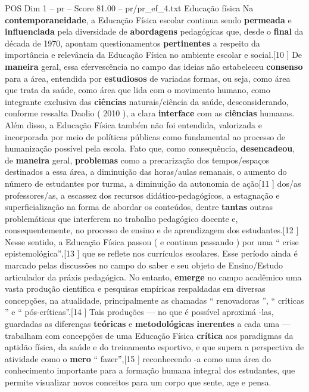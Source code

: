 \begin{textsample}{POS Dim 1 – pr – Score 81.00 – pr/pr\_ef\_4.txt}  \label{ex:f1_pos_025}
Educação física Na \textbf{contemporaneidade}, a Educação Física escolar continua sendo \textbf{permeada} e \textbf{influenciada} pela diversidade de \textbf{abordagens} pedagógicas que, desde o \textbf{final} da década de 1970, apontam questionamentos \textbf{pertinentes} a respeito da importância e relevância da Educação Física no ambiente escolar e social.[10 ] De \textbf{maneira} geral, essa efervescência no campo das ideias não estabeleceu \textbf{consenso} para a área, entendida por \textbf{estudiosos} de variadas formas, ou seja, como área que trata da saúde, como área que lida com o movimento humano, como integrante exclusiva das \textbf{ciências} naturais/ciência da saúde, desconsiderando, conforme ressalta Daolio ( 2010 ), a clara \textbf{interface} com as \textbf{ciências} humanas.
Além disso, a Educação Física também não foi entendida, valorizada e incorporada por meio de políticas públicas como fundamental ao processo de humanização possível pela escola.
Fato que, como consequência, \textbf{desencadeou}, de \textbf{maneira} geral, \textbf{problemas} como a precarização dos tempos/espaços destinados a essa área, a diminuição das horas/aulas semanais, o aumento do número de estudantes por turma, a diminuição da autonomia de ação[11 ] dos/as professores/as, a escassez dos recursos didático-pedagógicos, a estagnação e superficialização na forma de abordar os conteúdos, dentre \textbf{tantas} outras problemáticas que interferem no trabalho pedagógico docente e, consequentemente, no processo de ensino e de aprendizagem dos estudantes.[12 ] Nesse sentido, a Educação Física passou ( e continua passando ) por uma “ crise epistemológica”,[13 ] que se reflete nos currículos escolares.
Esse período ainda é marcado pelas discussões no campo do saber e seu objeto de Ensino/Estudo articulador da práxis pedagógica.
No entanto, \textbf{emerge} no campo acadêmico uma vasta produção científica e pesquisas empíricas respaldadas em diversas concepções, na atualidade, principalmente as chamadas “ renovadoras ”, “ críticas ” e “ pós-críticas”.[14 ] Tais produções — no que é possível aproximá -las, guardadas as diferenças \textbf{teóricas} e \textbf{metodológicas} \textbf{inerentes} a cada uma — trabalham com concepções de uma Educação Física \textbf{crítica} aos paradigmas da aptidão física, da saúde e do treinamento esportivo, e que supera a perspectiva de atividade como o \textbf{mero} “ fazer”,[15 ] reconhecendo -a como uma área do conhecimento importante para a formação humana integral dos estudantes, que permite visualizar novos conceitos para um corpo que sente, age e pensa.

\end{textsample}
